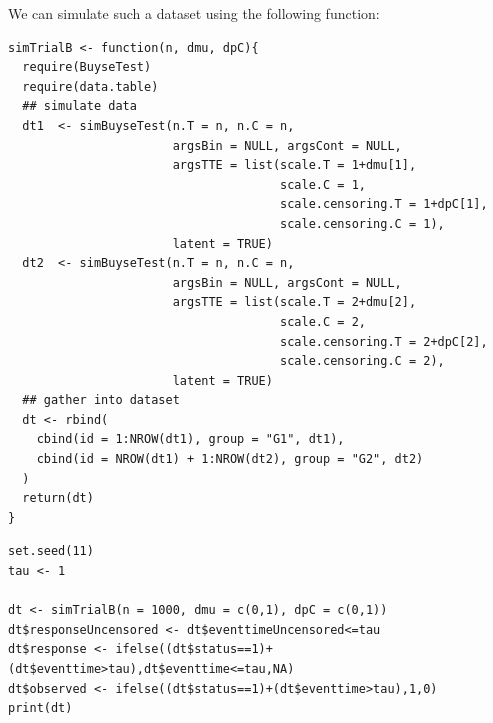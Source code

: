 \documentclass[12pt]{article}
\begin{document}
\bigskip

We can simulate such a dataset using the following function:
\lstset{language=r,label= ,caption= ,captionpos=b,numbers=none}
\begin{lstlisting}
simTrialB <- function(n, dmu, dpC){
  require(BuyseTest)
  require(data.table)
  ## simulate data
  dt1  <- simBuyseTest(n.T = n, n.C = n, 
                       argsBin = NULL, argsCont = NULL, 
                       argsTTE = list(scale.T = 1+dmu[1],
                                      scale.C = 1,
                                      scale.censoring.T = 1+dpC[1],
                                      scale.censoring.C = 1),
                       latent = TRUE)
  dt2  <- simBuyseTest(n.T = n, n.C = n, 
                       argsBin = NULL, argsCont = NULL, 
                       argsTTE = list(scale.T = 2+dmu[2],
                                      scale.C = 2,
                                      scale.censoring.T = 2+dpC[2],
                                      scale.censoring.C = 2),
                       latent = TRUE)
  ## gather into dataset
  dt <- rbind(
    cbind(id = 1:NROW(dt1), group = "G1", dt1),
    cbind(id = NROW(dt1) + 1:NROW(dt2), group = "G2", dt2)
  )
  return(dt)
}
\end{lstlisting}

\clearpage

\lstset{language=r,label= ,caption= ,captionpos=b,numbers=none}
\begin{lstlisting}
set.seed(11)
tau <- 1

dt <- simTrialB(n = 1000, dmu = c(0,1), dpC = c(0,1))
dt$responseUncensored <- dt$eventtimeUncensored<=tau
dt$response <- ifelse((dt$status==1)+(dt$eventtime>tau),dt$eventtime<=tau,NA)
dt$observed <- ifelse((dt$status==1)+(dt$eventtime>tau),1,0)
print(dt)
\end{lstlisting}
\end{document}
